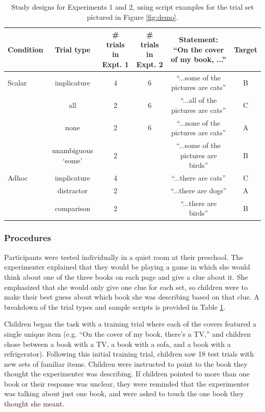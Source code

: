 \documentclass[10pt,letterpaper]{article}
\begin{document}
 \begin{table} [t]
   \caption{Study designs for Experiments 1 and 2, using script examples for the trial set pictured in Figure \ref{fig:demo}.  \label{tab:scripts} } 
   \begin{center} 
     \begin{tabular}{lccccc} 
                      \hline 
       \null   Condition  & Trial type & \# trials in Expt. 1 & \# trials in Expt. 2 & Statement: ``On the cover of my book, ...'' & Target   \\ 
       \hline  
            Scalar & implicature & 4 & 6 &  ``...some of the pictures are cats'' & B	 \\ 
          & all  & 2 &  6 & ``...all of the pictures are cats'' & C		                 \\
           & none  & 2 & 6 & ``...none of the pictures are cats'' & A			\\ 
               & unambiguous `some' 	&  2 &  & ``...some of the pictures are birds'' & B					        \\ 
	\hline
	    Adhoc       & implicature & 4 &  & ``...there are cats'' & C 		\\ 
	     & distractor & 2 &  & ``...there are dogs'' & A	     \\ 
          & comparison & 2 &  & ``...there are birds'' & B 	   \\
       \hline 
     \end{tabular} 
  \end{center}
 \end{table}
 
\subsubsection{Procedures}

Participants were tested individually in a quiet room at their preschool.  The experimenter explained that they would be playing a game in which she would think about one of the three books on each page and give a clue about it. She emphasized that she would only give one clue for each set, so children were to make their best guess about which book she was describing based on that clue. A breakdown of the trial types and sample scripts is provided in Table \ref{tab:scripts}.

Children began the task with a training trial where each of the covers featured a single unique item (e.g. ``On the cover of my book, there's a TV,'' and children chose between a book with a TV, a book with a sofa, and a book with a refrigerator). Following this initial training trial, children saw 18 test trials with new sets of familiar items. Children were instructed to point to the book they thought the experimenter was describing. If children pointed to more than one book or their response was unclear, they were reminded that the experimenter was talking about just one book, and were asked to touch the one book they thought she meant.  
\end{document}
